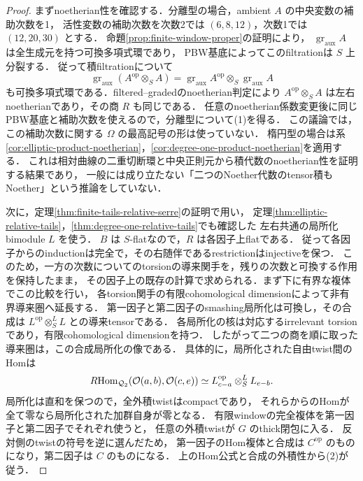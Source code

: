 \begin{proof}
まずnoetherian性を確認する．分離型の場合，ambient $A$ の中央変数の補助次数を1，
活性変数の補助次数を次数2では $(6,8,12)$，次数1では $(12,20,30)$ とする．
命題\ref{prop:finite-window-proper}の証明により，
$\operatorname{gr}_{\mathrm{aux}}A$ は全生成元を持つ可換多項式環であり，
PBW基底によってこのfiltrationは $S$ 上分裂する．
従って積filtrationについて
\[
 \operatorname{gr}_{\mathrm{aux}}(A^{\mathrm{op}}\otimes_S A)
   =\operatorname{gr}_{\mathrm{aux}}A^{\mathrm{op}}
       \otimes_S\operatorname{gr}_{\mathrm{aux}}A
\]
も可換多項式環である．filtered--gradedのnoetherian判定により
$A^{\mathrm{op}}\otimes_S A$ は左右noetherianであり，その商 $R$ も同じである．
任意のnoetherian係数変更後に同じPBW基底と補助次数を使えるので，分離型について(1)を得る．
この議論では，この補助次数に関する $\Omega$ の最高記号の形は使っていない．
楕円型の場合は系\ref{cor:elliptic-product-noetherian}，\ref{cor:degree-one-product-noetherian}を適用する．
これは相対曲線の二重切断環と中央正則元から積代数のnoetherian性を証明する結果であり，
一般には成り立たない「二つのNoether代数のtensor積もNoether」という推論をしていない．

次に，定理\ref{thm:finite-tails-relative-serre}の証明で用い，
定理\ref{thm:elliptic-relative-tails}，\ref{thm:degree-one-relative-tails}でも確認した
左右共通の局所化bimodule $L$ を使う．
$B$ は $S$-flatなので，$R$ は各因子上flatである．
従って各因子からのinductionは完全で，その右随伴であるrestrictionはinjectiveを保つ．
このため，一方の次数についてのtorsionの導来関手を，残りの次数と可換する作用を保持したまま，
その因子上の既存の計算で求められる．まず下に有界な複体でこの比較を行い，
各torsion関手の有限cohomological dimensionによって非有界導来圏へ延長する．
第一因子と第二因子のsmashing局所化は可換し，その合成は
$L^{\mathrm{op}}\otimes_S^L L$ との導来tensorである．
各局所化の核は対応するirrelevant torsionであり，有限cohomological dimensionを持つ．
したがって二つの商を順に取った導来圏は，この合成局所化の像である．
具体的に，局所化された自由twist間のHomは
\begin{equation}
 R\!\operatorname{Hom}_{\mathcal Q_2}
       (\mathcal O(a,b),\mathcal O(c,e))
   \simeq L^{\mathrm{op}}_{c-a}\otimes_S^L L_{e-b}.
 \label{eq:product-twist-hom}
\end{equation}
局所化は直和を保つので，全外積twistはcompactであり，
それらからのHomが全て零なら局所化された加群自身が零となる．
有限windowの完全複体を第一因子と第二因子でそれぞれ使うと，
任意の外積twistが $G$ のthick閉包に入る．
反対側のtwistの符号を逆に選んだため，
第一因子のHom複体と合成は $C^{\mathrm{op}}$ のものになり，第二因子は $C$ のものになる．
上のHom公式と合成の外積性から(2)が従う．


\end{proof}
